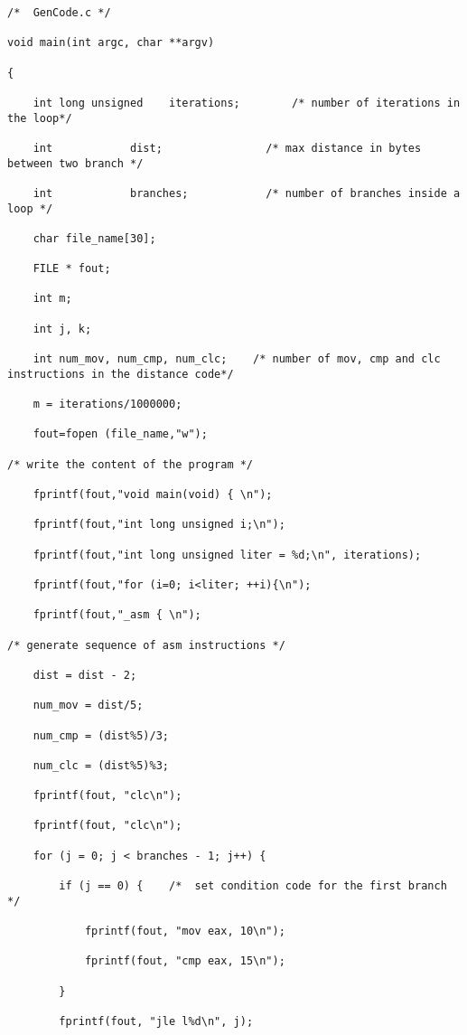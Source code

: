 \documentclass[]{ctexbook}
\begin{document}
\begin{verbatim}
/*  GenCode.c */

void main(int argc, char **argv)

{

    int long unsigned    iterations;        /* number of iterations in the loop*/

    int            dist;                /* max distance in bytes between two branch */

    int            branches;            /* number of branches inside a loop */

    char file_name[30];

    FILE * fout;

    int m;

    int j, k;

    int num_mov, num_cmp, num_clc;    /* number of mov, cmp and clc instructions in the distance code*/

    m = iterations/1000000;

    fout=fopen (file_name,"w");

/* write the content of the program */

    fprintf(fout,"void main(void) { \n");

    fprintf(fout,"int long unsigned i;\n");

    fprintf(fout,"int long unsigned liter = %d;\n", iterations);

    fprintf(fout,"for (i=0; i<liter; ++i){\n");

    fprintf(fout,"_asm { \n");

/* generate sequence of asm instructions */

    dist = dist - 2;

    num_mov = dist/5;

    num_cmp = (dist%5)/3;

    num_clc = (dist%5)%3;

    fprintf(fout, "clc\n");

    fprintf(fout, "clc\n");

    for (j = 0; j < branches - 1; j++) {

        if (j == 0) {    /*  set condition code for the first branch */

            fprintf(fout, "mov eax, 10\n");

            fprintf(fout, "cmp eax, 15\n");

        }

        fprintf(fout, "jle l%d\n", j);




\end{verbatim}
\end{document}
